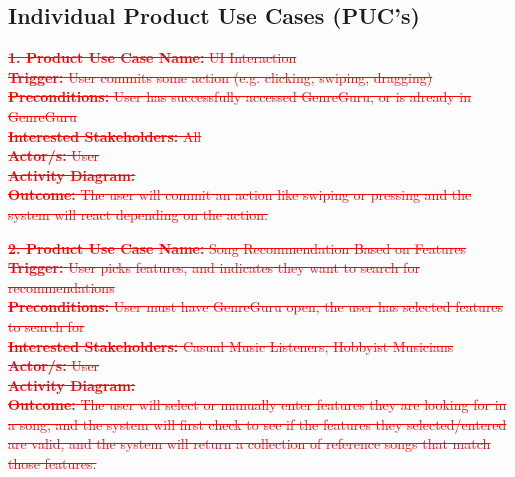 \documentclass[12pt]{article}
\begin{document}
\subsection{Individual Product Use Cases (PUC's)}
\textcolor{red}{\sout{\textbf{1. Product Use Case Name:} UI Interaction}} \\
\textcolor{red}{\sout{\textbf{Trigger:} User commits some action (e.g. clicking, swiping, dragging)}} \\
\textcolor{red}{\sout{\textbf{Preconditions:} User has successfully accessed GenreGuru, or is already in GenreGuru}} \\
\textcolor{red}{\sout{\textbf{Interested Stakeholders:} All}} \\
\textcolor{red}{\sout{\textbf{Actor/s:} User}} \\
\textcolor{red}{\sout{\textbf{Activity Diagram:}}} \\
\textcolor{red}{\sout{\textbf{Outcome:} The user will commit an action like swiping or pressing and the system will react depending on the action.}}

\vspace{1cm}

\textcolor{red}{\sout{\noindent \textbf{2. Product Use Case Name:} Song Recommendation Based on Features}} \\
\textcolor{red}{\sout{\textbf{Trigger:} User picks features, and indicates they want to search for recommendations}} \\
\textcolor{red}{\sout{\textbf{Preconditions:} User must have GenreGuru open, the user has selected features to search for}} \\
\textcolor{red}{\sout{\textbf{Interested Stakeholders:} Casual Music Listeners, Hobbyist Musicians}} \\
\textcolor{red}{\sout{\textbf{Actor/s:} User}} \\
\textcolor{red}{\sout{\textbf{Activity Diagram:}}} \\
\textcolor{red}{\sout{\textbf{Outcome:} The user will select or manually enter features they are looking for in a song, and the system will first check to see if the features they selected/entered are valid, and the system will return a collection of reference songs that match those features.}}

\vspace{1cm}
\end{document}
